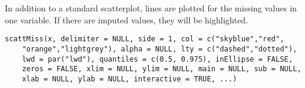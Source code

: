 %
\begin{Description}\relax
In addition to a standard scatterplot, lines are plotted for the missing
values in one variable. If there are imputed values, they will be
highlighted.
\end{Description}
%
\begin{Usage}
\begin{verbatim}
scattMiss(x, delimiter = NULL, side = 1, col = c("skyblue","red",
    "orange","lightgrey"), alpha = NULL, lty = c("dashed","dotted"),
    lwd = par("lwd"), quantiles = c(0.5, 0.975), inEllipse = FALSE,
    zeros = FALSE, xlim = NULL, ylim = NULL, main = NULL, sub = NULL,
    xlab = NULL, ylab = NULL, interactive = TRUE, ...)
\end{verbatim}
\end{Usage}
%
